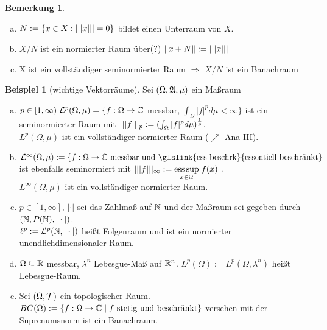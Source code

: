 \documentclass[ngerman]{report}
\theoremstyle{plain}%
\theoremstyle{definition}%
\newtheorem{bsp}[thm]{Beispiel}
\theoremstyle{myStyle}
\newtheorem{bem}[thm]{Bemerkung}
\begin{document}
\begin{bem}
	\begin{enumerate}[(a)]
		\item $N:=\{x\in X: ||| x |||=0\}$ bildet einen Unterraum von $X$.
		\item $X/N$ ist ein normierter Raum über(?) $\left \|x+N\right\| := ||| x |||$
		\item X ist ein vollständiger seminormierter Raum $\Rightarrow$ $X/N$ ist ein Banachraum 
	\end{enumerate}
\end{bem}

\begin{bsp}[wichtige Vektorräume]
	Sei $(\Omega,\mathfrak{A},\mu)$ ein Maßraum
		\begin{enumerate}[(a)]
			\item $p\in[1,\infty)\; \mathcal{L}^p(\Omega,\mu) = \{f:\Omega \rightarrow \mathbb{C}$ messbar, 
						$\int_\Omega |f|^p d\mu < \infty \}$ ist ein seminormierter Raum mit 
						$||| f |||_p := (\int_\Omega |f|^p d\mu )^{\frac{1}{p}}$.\\
						$L^p(\Omega,\mu)$ ist ein vollständiger normierter Raum ($\nearrow$ Ana III).

			\item $\hL^\infty(\Omega,\mu) := \{f:\Omega \rightarrow \C 
						\text{ messbar und \glslink{ess beschrk}{essentiell beschränkt} }$ ist ebenfalls seminormiert mit 
						$||| f |||_\infty := \underset{x\in\Omega}{\textnormal{ess} \sup} |f(x)|$.\\
						$L^\infty(\Omega,\mu)$ ist ein vollständiger normierter Raum.

			\item $p\in [1,\infty],\, |\cdot|$ sei das Zählmaß auf $\mathbb{N}$ und der Maßraum sei gegeben durch 
						$(\mathbb{N}, P(\mathbb{N}), |\cdot|)$.\\
						$\ell^p := \mathcal{L}^p(\mathbb{N}, |\cdot|)$ heißt Folgenraum und ist ein normierter unendlichdimensionaler Raum.

			\item $\Omega \subseteq \mathbb{R}$ messbar, $\lambda^n$ Lebesgue-Maß auf $\mathbb{R}^n$.
						$L^p(\Omega) := L^p(\Omega,\lambda^n)$ heißt Lebesgue-Raum.

			\item Sei $(\Omega, \mathcal{T})$ ein topologischer Raum. 
						$BC(\Omega) := \{ f: \Omega \rightarrow \mathbb{C}\;|\;f 
						\text{ stetig und beschränkt} \}$ versehen mit der Suprenumsnorm ist ein Banachraum.
	\end{enumerate}
\end{bsp}
\end{document}
